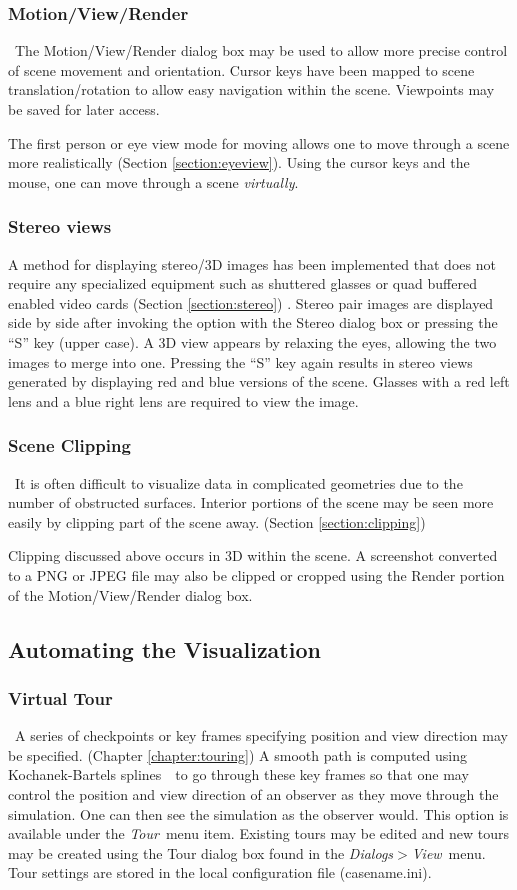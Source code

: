 \documentclass[11pt,twoside]{book}
\begin{document}
\subsubsection{Motion/View/Render}\ The Motion/View/Render dialog box may be used to
allow more precise control of scene movement and orientation.
Cursor keys have been mapped to scene translation/rotation to
allow easy navigation within the scene.  Viewpoints may be saved for later access.

The first person or eye view mode for moving
allows one to move through a scene more
realistically (Section \ref{section:eyeview}).  Using the cursor keys and the
mouse, one can move through a scene {\em virtually}.

\subsubsection{Stereo views}A method for displaying stereo/3D
images has been implemented that does
not require any specialized equipment such as shuttered glasses or
quad buffered enabled video cards (Section \ref{section:stereo}) .
Stereo pair images are displayed side by side after invoking the option with
the Stereo dialog box or pressing the ``S'' key (upper case).
A 3D view appears by relaxing the eyes, allowing the two images to merge into one.
Pressing the ``S'' key again results in stereo views generated by
displaying red and blue versions of the scene.
Glasses with a red left lens and a blue right lens are required to view the image.

\subsubsection{Scene Clipping}\ It is often difficult to visualize data
in complicated geometries due to the number of obstructed
surfaces. Interior portions of the scene may be seen more easily
by clipping part of the scene away. (Section
\ref{section:clipping})

Clipping discussed above occurs in 3D within the scene.  A
screenshot converted to a PNG or JPEG file may also be clipped or
cropped using the Render portion of the Motion/View/Render
dialog box.

\subsection{Automating the Visualization}
\subsubsection{Virtual Tour}\   A series of checkpoints or key frames
specifying position and view direction may be specified. (Chapter
\ref{chapter:touring}) A smooth path is computed using
Kochanek-Bartels splines~\cite{Moller:02}\ to go through these key
frames so that one may control the position and view direction of
an observer as they move through the simulation. One can then see
the simulation as the observer would. This option is available
under the {\em Tour}\ menu item. Existing tours may be edited and
new tours may be created using the Tour dialog box found in
the {\em Dialogs$>$View}\ menu. Tour settings are stored in the local
configuration file (casename.ini).
\end{document}
